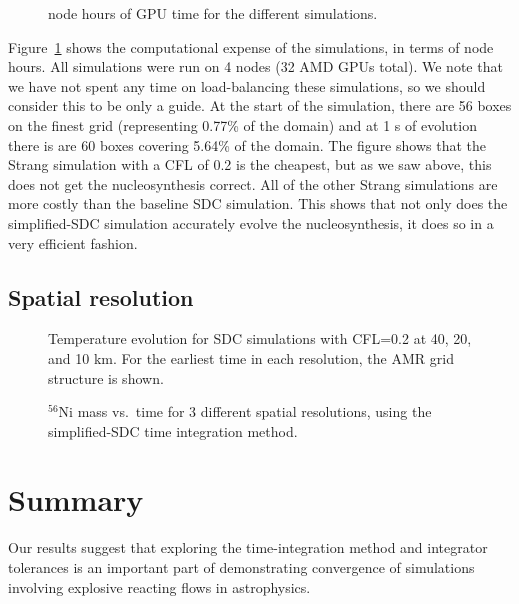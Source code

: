 \documentclass[modern]{aastex631}
\newcommand{\isot}[2]{$^{#2}\mathrm{#1}$}
\begin{document}
\begin{figure}[t]
\centering
{}
\caption{\label{fig:cpu} node hours of GPU time for the different simulations.}
\end{figure}




Figure~\ref{fig:cpu} shows the computational expense of the
simulations, in terms of node hours.  All simulations were run on 4
nodes (32 AMD GPUs total).  We note that we have not spent any time on
load-balancing these simulations, so we should consider this to be
only a guide.  At the start of the simulation, there are 56 boxes on
the finest grid (representing 0.77\% of the domain) and at 1 s of
evolution there is are 60 boxes covering 5.64\% of the domain.  The
figure shows that the Strang simulation with a CFL of 0.2 is the
cheapest, but as we saw above, this does not get the nucleosynthesis
correct.  All of the other Strang simulations are more costly than the
baseline SDC simulation.  This shows that not only does the
simplified-SDC simulation accurately evolve the nucleosynthesis, it
does so in a very efficient fashion.

\subsection{Spatial resolution}

\begin{figure}[t]
\centering
{}
\caption{\label{fig:res_panel} Temperature evolution for SDC simulations with CFL=0.2 at 40, 20, and 10 km.  For the earliest time
  in each resolution, the AMR grid structure is shown.}
\end{figure}


\begin{figure}[t]
\centering
{}
\caption{\label{fig:res} \isot{Ni}{56} mass vs.\ time for 3 different spatial resolutions, using the simplified-SDC time integration method.}
\end{figure}




\section{Summary}

Our results suggest that exploring the time-integration method and
integrator tolerances is an important part of demonstrating
convergence of simulations involving explosive reacting flows in
astrophysics.
\end{document}

